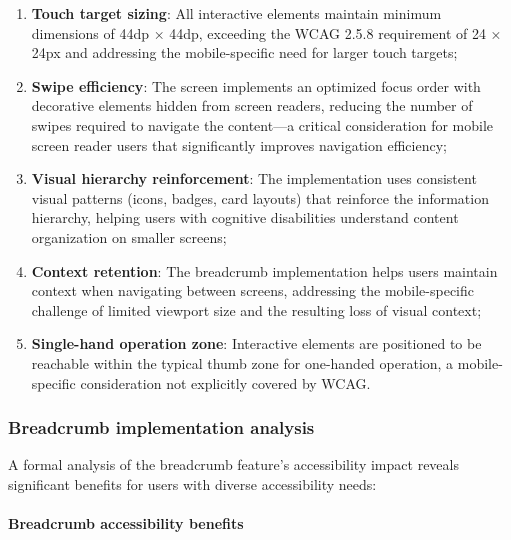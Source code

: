 \begin{enumerate}
    \item \textbf{Touch target sizing}: All interactive elements maintain minimum dimensions of 44dp × 44dp, exceeding the WCAG 2.5.8 requirement of 24 × 24px and addressing the mobile-specific need for larger touch targets;
    
    \item \textbf{Swipe efficiency}: The screen implements an optimized focus order with decorative elements hidden from screen readers, reducing the number of swipes required to navigate the content—a critical consideration for mobile screen reader users that significantly improves navigation efficiency;
    
    \item \textbf{Visual hierarchy reinforcement}: The implementation uses consistent visual patterns (icons, badges, card layouts) that reinforce the information hierarchy, helping users with cognitive disabilities understand content organization on smaller screens;
    
    \item \textbf{Context retention}: The breadcrumb implementation helps users maintain context when navigating between screens, addressing the mobile-specific challenge of limited viewport size and the resulting loss of visual context;
    
    \item \textbf{Single-hand operation zone}: Interactive elements are positioned to be reachable within the typical thumb zone for one-handed operation, a mobile-specific consideration not explicitly covered by WCAG.
\end{enumerate}

\subsubsection{Breadcrumb implementation analysis}

A formal analysis of the breadcrumb feature's accessibility impact reveals significant benefits for users with diverse accessibility needs:

\paragraph{Breadcrumb accessibility benefits}


